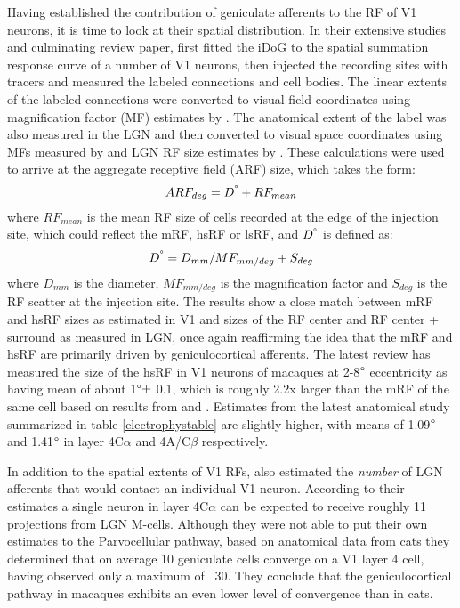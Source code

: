 Having established the contribution of geniculate afferents to the RF
of V1 neurons, it is time to look at their spatial distribution. In their
extensive studies and culminating review paper, \cite{Angelucci2006}
first fitted the iDoG to the spatial summation response curve of a
number of V1 neurons, then injected the recording sites with tracers and
measured the labeled connections and cell bodies. The linear
extents of the labeled connections were converted to visual field
coordinates using magnification factor (MF) estimates by
\cite{VanEssen1984}. The anatomical extent of the label was also
measured in the LGN and then converted to visual space coordinates using
MFs measured by \cite{Connolly1984} and LGN RF size estimates by
\cite{Derrington1984}. These calculations were used to arrive at the
aggregate receptive field (ARF) size, which takes the form:
\begin{equation}
  ARF_{deg} = D^{\degree} + RF_{mean}
\end{equation}
where $RF_{mean}$ is the mean RF size of cells recorded at the edge of
the injection site, which could reflect the mRF, hsRF or lsRF, and
$D^{\degree}$ is defined as:
\begin{equation}
  D^{\degree} = D_{mm} / MF_{mm/deg} + S_{deg}
\end{equation}
where $D_{mm}$ is the diameter, $MF_{mm/deg}$ is the magnification
factor and $S_{deg}$ is the RF scatter at the injection site. The
results show a close match between mRF and hsRF sizes as estimated in
V1 and sizes of the RF center and RF center + surround as measured in
LGN, once again reaffirming the idea that the mRF and hsRF are
primarily driven by geniculocortical afferents. The latest review
\citep{Angelucci2006} has measured the size of the hsRF in V1 neurons
of macaques at 2-8$\degree$ eccentricity as having mean of about
1$\degree \pm$ 0.1, which is roughly 2.2x larger than the mRF of the
same cell based on results from \cite{Angelucci2002} and
\cite{Levitt2002}. Estimates from the latest anatomical study
summarized in table \ref{electrophystable} are slightly higher,
with means of 1.09$\degree$ and 1.41$\degree$ in layer
4C$\alpha$ and 4A/C$\beta$ respectively.

In addition to the spatial extents of V1 RFs, \cite{Angelucci2006a}
also estimated the \emph{number} of LGN afferents that would contact an
individual V1 neuron. According to their estimates a single neuron in
layer 4C$\alpha$ can be expected to receive roughly 11 projections
from LGN M-cells. Although they were not able to put their own
estimates to the Parvocellular pathway, based on anatomical data from
cats they determined that on average 10 geniculate cells converge on a
V1 layer 4 cell, having observed only a maximum of ~30. They conclude
that the geniculocortical pathway in macaques exhibits an even lower
level of convergence than in cats.

